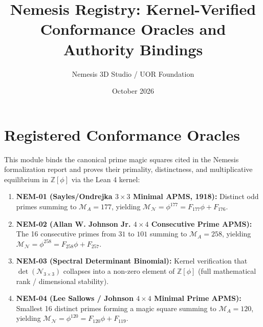 \documentclass{article}
\title{Nemesis Registry: Kernel-Verified Conformance Oracles and Authority Bindings}
\author{Nemesis 3D Studio / UOR Foundation}
\date{October 2026}
\begin{document}
\section{Registered Conformance Oracles}
This module binds the canonical prime magic squares cited in the Nemesis formalization report and proves their primality, distinctness, and multiplicative equilibrium in $\mathbb{Z}[\phi]$ via the Lean 4 kernel:
\begin{enumerate}
  \item \textbf{NEM-01 (Sayles/Ondrejka $3 \times 3$ Minimal APMS, 1918):} Distinct odd primes summing to $\mathcal{M}_A = 177$, yielding $\mathcal{M}_{\mathcal{N}} = \phi^{177} = F_{177}\phi + F_{176}$.
  \item \textbf{NEM-02 (Allan W. Johnson Jr. $4 \times 4$ Consecutive Prime APMS):} The 16 consecutive primes from $31$ to $101$ summing to $\mathcal{M}_A = 258$, yielding $\mathcal{M}_{\mathcal{N}} = \phi^{258} = F_{258}\phi + F_{257}$.
  \item \textbf{NEM-03 (Spectral Determinant Binomial):} Kernel verification that $\det(\mathcal{N}_{3\times 3})$ collapses into a non-zero element of $\mathbb{Z}[\phi]$ (full mathematical rank / dimensional stability).
  \item \textbf{NEM-04 (Lee Sallows / Johnson $4 \times 4$ Minimal Prime APMS):} Smallest 16 distinct primes forming a magic square summing to $\mathcal{M}_A = 120$, yielding $\mathcal{M}_{\mathcal{N}} = \phi^{120} = F_{120}\phi + F_{119}$.
\end{enumerate}
\end{document}
